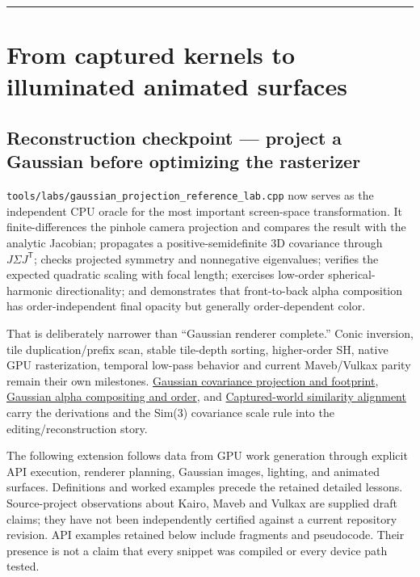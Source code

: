 \begin{center}\rule{0.5\linewidth}{0.5pt}\end{center}

\section{From captured kernels to illuminated animated surfaces}\label{04-visual-computing-ii-ch036-from-captured-kernels-to-illuminated-animated-surfaces}

\hypertarget{04-visual-computing-ii-ch036-from-captured-kernels-to-illuminated-animated-surfaces}{}

\subsection{Reconstruction checkpoint --- project a Gaussian before optimizing the rasterizer}\label{04-visual-computing-ii-ch036-reconstruction-checkpoint-project-a-gaussian-before-optimizing-the-rasterizer}

\hypertarget{04-visual-computing-ii-ch036-reconstruction-checkpoint-project-a-gaussian-before-optimizing-the-rasterizer}{}

\texttt{tools/labs/gaussian\_projection\_reference\_lab.cpp} now serves as the independent CPU oracle for the most important screen-space transformation. It finite-differences the pinhole camera projection and compares the result with the analytic Jacobian; propagates a positive-semidefinite 3D covariance through \(J\Sigma J^{\mathsf T}\); checks projected symmetry and nonnegative eigenvalues; verifies the expected quadratic scaling with focal length; exercises low-order spherical-harmonic directionality; and demonstrates that front-to-back alpha composition has order-independent final opacity but generally order-dependent color.

That is deliberately narrower than ``Gaussian renderer complete.'' Conic inversion, tile duplication/prefix scan, stable tile-depth sorting, higher-order SH, native GPU rasterization, temporal low-pass behavior and current Maveb/Vulkax parity remain their own milestones. \hyperref[appendix-24269cb6977c]{Gaussian covariance projection and footprint}, \hyperref[appendix-5f4b2e24c3f6]{Gaussian alpha compositing and order}, and \hyperref[appendix-5f40b4fea463]{Captured-world similarity alignment} carry the derivations and the Sim(3) covariance scale rule into the editing/reconstruction story.

The following extension follows data from GPU work generation through explicit API execution, renderer planning, Gaussian images, lighting, and animated surfaces. Definitions and worked examples precede the retained detailed lessons. Source-project observations about Kairo, Maveb and Vulkax are supplied draft claims; they have not been independently certified against a current repository revision. API examples retained below include fragments and pseudocode. Their presence is not a claim that every snippet was compiled or every device path tested.

